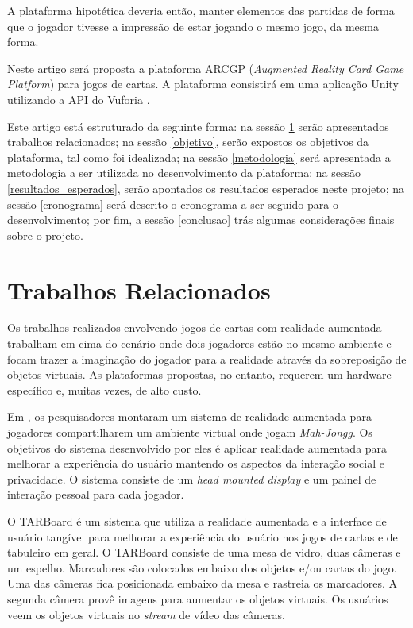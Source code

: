 \documentclass[conference]{IEEEtran}
\begin{document}
A plataforma hipotética deveria então, manter elementos das partidas de forma 
que o jogador tivesse a impressão de estar jogando o mesmo jogo, da mesma forma.

Neste artigo será proposta a plataforma ARCGP (\textit{Augmented Reality Card 
Game Platform}) para jogos de cartas. A plataforma consistirá em uma aplicação 
Unity \cite{unity} utilizando a API do Vuforia \cite{vuforia}. 

Este artigo está estruturado da seguinte forma: na sessão \ref{rel} serão 
apresentados trabalhos relacionados; na sessão \ref{objetivo}, serão expostos os 
objetivos da plataforma, tal como foi idealizada; na sessão \ref{metodologia} 
será apresentada a metodologia a ser utilizada no desenvolvimento da plataforma; 
na sessão \ref{resultados_esperados}, serão apontados os resultados esperados 
neste projeto; na sessão \ref{cronograma} será descrito o cronograma a ser 
seguido para o desenvolvimento; por fim, a sessão \ref{conclusao} trás algumas 
considerações finais sobre o projeto.

\section{Trabalhos Relacionados}
\label{rel}
Os trabalhos realizados envolvendo jogos de cartas com realidade aumentada 
trabalham em cima do cenário onde dois jogadores estão no mesmo ambiente e focam 
trazer a imaginação do jogador para a realidade através da sobreposição de 
objetos virtuais. As plataformas propostas, no entanto, requerem um hardware 
específico e, muitas vezes, de alto custo.

Em \cite{Szalavari:1998:CGA:293701.293740}, os pesquisadores montaram um sistema 
de realidade aumentada para jogadores compartilharem um ambiente virtual onde 
jogam \textit{Mah-Jongg}. Os objetivos do sistema desenvolvido por eles é 
aplicar realidade aumentada para melhorar a experiência do usuário mantendo os 
aspectos da interação social e privacidade. O sistema consiste de um 
\textit{head mounted display} e um painel de interação pessoal para cada 
jogador.

O TARBoard \cite{lee2005tarboard} é um sistema que utiliza a realidade aumentada 
e a interface de usuário tangível para melhorar a experiência do usuário nos 
jogos de cartas e de tabuleiro em geral. O TARBoard consiste de uma mesa de 
vidro, duas câmeras e um espelho. Marcadores são colocados embaixo dos objetos 
e/ou cartas do jogo. Uma das câmeras fica posicionada embaixo da mesa e rastreia 
os marcadores. A segunda câmera provê imagens para aumentar os objetos virtuais. 
Os usuários veem os objetos virtuais no \textit{stream} de vídeo das câmeras.
\end{document}
